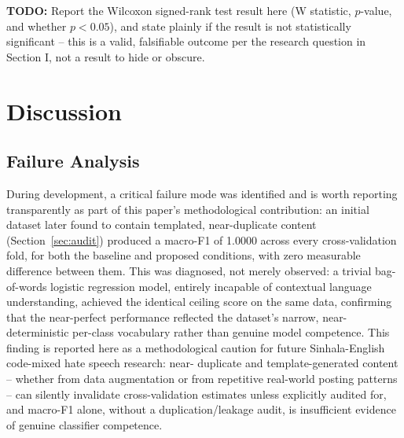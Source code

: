 \documentclass[journal]{IEEEtran}
\begin{document}
\textbf{TODO:} Report the Wilcoxon signed-rank test result here (W
statistic, $p$-value, and whether $p < 0.05$), and state plainly if the
result is not statistically significant -- this is a valid, falsifiable
outcome per the research question in Section I, not a result to hide or
obscure.

\section{Discussion}

\subsection{Failure Analysis}
\label{sec:failure-analysis}


During development, a critical failure mode was identified and is worth
reporting transparently as part of this paper's methodological
contribution: an initial dataset later found to contain templated,
near-duplicate content (Section~\ref{sec:audit}) produced a macro-F1 of
1.0000 across every cross-validation fold, for both the baseline and
proposed conditions, with zero measurable difference between them. This
was diagnosed, not merely observed: a trivial bag-of-words logistic
regression model, entirely incapable of contextual language
understanding, achieved the identical ceiling score on the same data,
confirming that the near-perfect performance reflected the dataset's
narrow, near-deterministic per-class vocabulary rather than genuine
model competence. This finding is reported here as a methodological
caution for future Sinhala-English code-mixed hate speech research: near-
duplicate and template-generated content -- whether from data
augmentation or from repetitive real-world posting patterns -- can
silently invalidate cross-validation estimates unless explicitly audited
for, and macro-F1 alone, without a duplication/leakage audit, is
insufficient evidence of genuine classifier competence.
\end{document}
